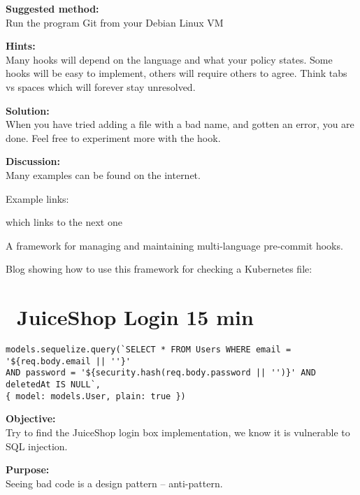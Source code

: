 \documentclass[a4paper,11pt,notitlepage]{report}
\begin{document}
{\bf Suggested method:}\\
Run the program Git from your Debian Linux VM


{\bf Hints:}\\
Many hooks will depend on the language and what your policy states. Some hooks will be easy to implement, others will require others to agree. Think tabs vs spaces which will forever stay unresolved.

{\bf Solution:}\\
When you have tried adding a file with a bad name, and gotten an error, you are done. Feel free to experiment more with the hook.

{\bf Discussion:}\\
Many examples can be found on the internet.

Example links:
\begin{list2}
\item {} which links to the next one
\item A framework for managing and maintaining multi-language pre-commit hooks.\\
\item Blog showing how to use this framework for checking a Kubernetes file:\\
\end{list2}


\chapter{\faExclamationTriangle\ JuiceShop Login 15 min}
\label{ex:juice-shop-login}

\begin{verbatim}
models.sequelize.query(`SELECT * FROM Users WHERE email = '${req.body.email || ''}'
AND password = '${security.hash(req.body.password || '')}' AND deletedAt IS NULL`,
{ model: models.User, plain: true })
\end{verbatim}

{\bf Objective:}\\
Try to find the JuiceShop login box implementation, we know it is vulnerable to SQL injection.


{\bf Purpose:}\\
Seeing bad code is a design pattern -- anti-pattern.
\end{document}
